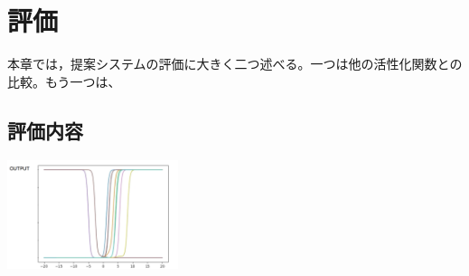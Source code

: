 \chapter{評価}
\label{evaluation}
本章では，提案システムの評価に大きく二つ述べる。一つは他の活性化関数との比較。もう一つは、

\section{評価内容}


\includegraphics[width=5cm]{asset/output.png}


